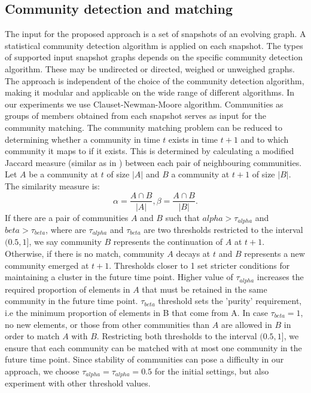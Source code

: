 \documentclass{article} %
\begin{document}
\subsection{Community detection and matching}
The input for the proposed approach is a set of snapshots of an evolving graph. A statistical community detection algorithm is applied on each snapshot. The types of supported input snapshot graphs depends on the specific community detection algorithm. These may be  undirected or directed, weighed or unweighed graphs. The approach is independent of the choice of the community detection algorithm, making it modular and applicable on the wide range of different algorithms. In our experiments we use Clauset-Newman-Moore\cite{clauset-newman-moore} algorithm. Communities as groups of members obtained from each snapshot serves as input for the community matching. The community matching problem can be reduced to determining whether a community in time $t$ exists in time $t+1$ and to which community it maps to if it exists. This is determined by calculating a modified Jaccard measure (similar as in \cite{gliwa2013})  between each pair of neighbouring communities. Let  $A$ be a community at $t$ of size $|A|$ and $B$ a community at $t+1$ of size $|B|$. The similarity measure is:
\begin{equation}
\alpha = \frac{A\cap B}{|A|},
\beta = \frac{A\cap B}{|B|}.
\end{equation}
If there are a pair of communities $A$ and $B$ such that $alpha > \tau_{alpha}$ and $beta > \tau_{beta}$, where are $\tau_{alpha}$ and $\tau_{beta}$ are two thresholds restricted to the interval $(0.5, 1]$, we say community $B$ represents the continuation of $A$ at $t+1$. Otherwise, if there is no match, community $A$ decays at $t$ and $B$ represents a new community emerged at $t+1$. Thresholds closer to 1 set stricter conditions for maintaining a cluster in the future time point. Higher value of $\tau_{alpha}$ increases the required proportion of elements in $A$ that must be retained in the same community in the future time point. $\tau_{beta}$ threshold sets the 'purity' requirement, i.e the minimum proportion of elements in B that come from A. In case $\tau_{beta} = 1$, no new elements, or those from other communities than $A$ are allowed in $B$ in order to match $A$ with $B$. Restricting both thresholds to the interval $(0.5, 1]$, we ensure that each community can be matched with at most one community in the future time point. Since stability of communities can pose a difficulty in our approach, we choose $\tau_{alpha} = \tau_{alpha} = 0.5$ for the initial settings, but also experiment with other threshold values.
\end{document}
